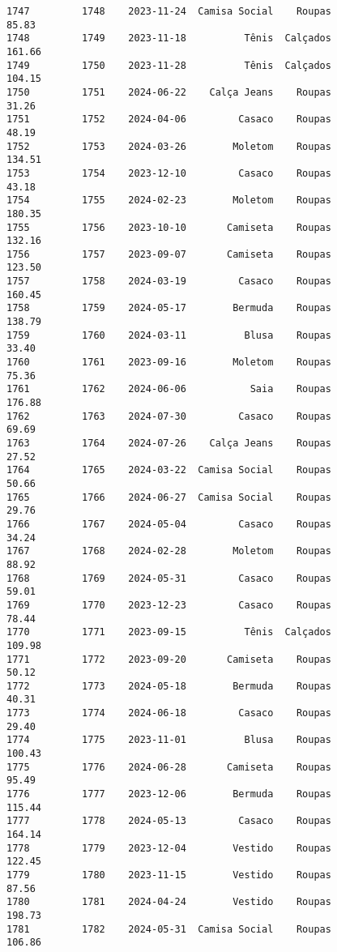 \documentclass[11pt]{article}
\begin{document}
\begin{Verbatim}[commandchars=\\\{\}]
1747         1748    2023-11-24  Camisa Social    Roupas           85.83   
1748         1749    2023-11-18          Tênis  Calçados          161.66   
1749         1750    2023-11-28          Tênis  Calçados          104.15   
1750         1751    2024-06-22    Calça Jeans    Roupas           31.26   
1751         1752    2024-04-06         Casaco    Roupas           48.19   
1752         1753    2024-03-26        Moletom    Roupas          134.51   
1753         1754    2023-12-10         Casaco    Roupas           43.18   
1754         1755    2024-02-23        Moletom    Roupas          180.35   
1755         1756    2023-10-10       Camiseta    Roupas          132.16   
1756         1757    2023-09-07       Camiseta    Roupas          123.50   
1757         1758    2024-03-19         Casaco    Roupas          160.45   
1758         1759    2024-05-17        Bermuda    Roupas          138.79   
1759         1760    2024-03-11          Blusa    Roupas           33.40   
1760         1761    2023-09-16        Moletom    Roupas           75.36   
1761         1762    2024-06-06           Saia    Roupas          176.88   
1762         1763    2024-07-30         Casaco    Roupas           69.69   
1763         1764    2024-07-26    Calça Jeans    Roupas           27.52   
1764         1765    2024-03-22  Camisa Social    Roupas           50.66   
1765         1766    2024-06-27  Camisa Social    Roupas           29.76   
1766         1767    2024-05-04         Casaco    Roupas           34.24   
1767         1768    2024-02-28        Moletom    Roupas           88.92   
1768         1769    2024-05-31         Casaco    Roupas           59.01   
1769         1770    2023-12-23         Casaco    Roupas           78.44   
1770         1771    2023-09-15          Tênis  Calçados          109.98   
1771         1772    2023-09-20       Camiseta    Roupas           50.12   
1772         1773    2024-05-18        Bermuda    Roupas           40.31   
1773         1774    2024-06-18         Casaco    Roupas           29.40   
1774         1775    2023-11-01          Blusa    Roupas          100.43   
1775         1776    2024-06-28       Camiseta    Roupas           95.49   
1776         1777    2023-12-06        Bermuda    Roupas          115.44   
1777         1778    2024-05-13         Casaco    Roupas          164.14   
1778         1779    2023-12-04        Vestido    Roupas          122.45   
1779         1780    2023-11-15        Vestido    Roupas           87.56   
1780         1781    2024-04-24        Vestido    Roupas          198.73   
1781         1782    2024-05-31  Camisa Social    Roupas          106.86   

\end{Verbatim}
\end{document}
